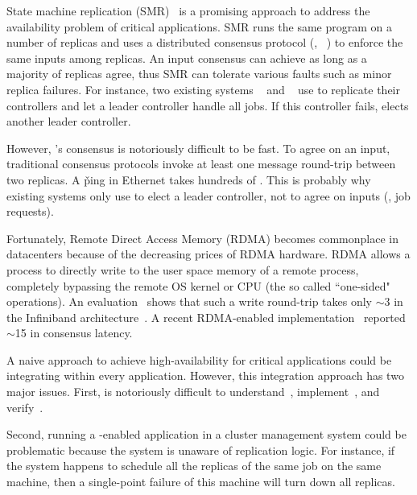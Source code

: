 State machine replication (SMR)~\cite{paxos} is a promising approach 
to address the availability problem of critical applications. SMR runs the 
same program on a number of replicas and uses a distributed consensus protocol 
(\eg, 
\paxos~\cite{paxos:practical,paxos,paxos:simple,paxos:complex,epaxos:sosp13}) 
to enforce the same inputs among 
replicas. An input consensus can achieve as long as a majority of replicas 
agree, thus SMR can tolerate various faults such as minor replica failures. For 
instance, two existing systems \borg~\cite{borg:eurosys15} and 
\mesos~\cite{mesos:nsdi11} use \paxos to replicate their controllers and let a 
leader controller handle all jobs. If this controller fails, \paxos elects 
another leader controller.



However, \paxos's consensus is notoriously difficult to be fast. 
To agree on an input, traditional consensus protocols invoke at least one 
message round-trip between two replicas. A \v{ping} in Ethernet 
takes hundreds of \us. This is probably why existing 
systems only use \paxos to elect a leader controller, not to agree on inputs 
(\ie, job requests).

Fortunately, Remote Direct Access Memory (RDMA) becomes commonplace in 
datacenters because of the decreasing prices of RDMA hardware. RDMA allows a 
process to directly write to the user space memory of a remote process, 
completely bypassing the remote OS kernel or CPU (the so called ``one-sided" 
operations). An evaluation~\cite{pilaf:usenix14} shows that such a write 
round-trip takes only $\sim$3 \us in the Infiniband 
architecture~\cite{infiniband}. A recent 
RDMA-enabled \paxos implementation~\cite{dare:hpdc15} reported 
$\sim$15 \us in consensus latency.

A naive approach to achieve high-availability for critical applications could 
be integrating \paxos within every application. However, this integration 
approach has two major issues. First, \paxos is notoriously difficult 
to understand~\cite{raft:usenix14}, implement~\cite{paxos:practical}, and 
verify~\cite{demeter:sosp11}.

Second, running a \paxos-enabled application in a 
cluster management system could be problematic because the system is unaware 
of replication logic. For instance, if the system happens to schedule all 
the replicas of the same job on the same machine, then a single-point failure 
of this machine will turn down all replicas. 

